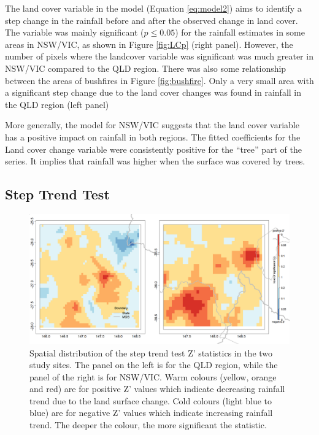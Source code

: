 \documentclass[fleqn,10pt,lineno]{wlpeerj} %
\begin{document}
The land cover variable in the model (Equation \eqref{eq:model2}) aims to
identify a step change in the rainfall before and after the observed
change in land cover. The variable was mainly significant
(\(p \leq 0.05\)) for the rainfall estimates in some areas in NSW/VIC,
as shown in Figure \ref{fig:LCp} (right panel). However, the number of
pixels where the landcover variable was significant was much greater in
NSW/VIC compared to the QLD region. There was also some relationship
between the areas of bushfires in Figure \ref{fig:bushfire}. Only a very
small area with a significant step change due to the land cover changes
was found in rainfall in the QLD region (left panel)

More generally, the model for NSW/VIC suggests that the land cover
variable has a positive impact on rainfall in both regions. The fitted
coefficients for the Land cover change variable were consistently
positive for the ``tree'' part of the series. It implies that rainfall
was higher when the surface was covered by trees.

\subsection{Step Trend Test}\label{step-trend-test-2}

\begin{figure}
\includegraphics[width=0.9\linewidth]{figures/step_new} \caption{Spatial distribution of the step trend test Z' statistics in the two study sites. The panel on the left is for the QLD region, while the panel of the right is for NSW/VIC. Warm colours (yellow, orange and red) are for positive Z' values which indicate decreasing rainfall trend due to the land surface change. Cold colours (light blue to blue) are for negative Z' values which indicate increasing rainfall trend. The deeper the colour, the more significant the statistic.}\label{fig:steptest30}
\end{figure}
\end{document}
